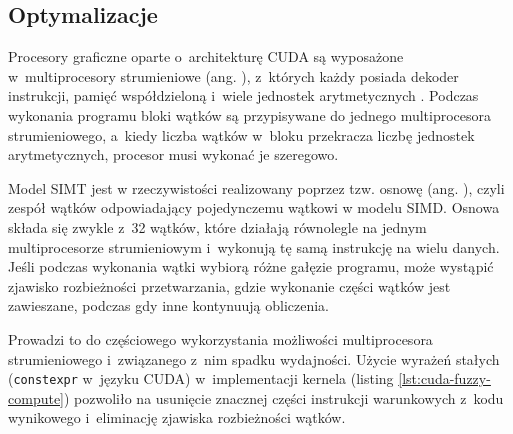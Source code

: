 \subsection*{Optymalizacje}

Procesory graficzne oparte o~architekturę CUDA są wyposażone w~multiprocesory strumieniowe
(ang. ), z~których każdy posiada dekoder instrukcji, pamięć
współdzieloną i~wiele jednostek arytmetycznych \cite{computer-arch}. Podczas wykonania programu
bloki wątków są przypisywane do jednego multiprocesora strumieniowego, a~kiedy liczba wątków w~bloku
przekracza liczbę jednostek arytmetycznych, procesor musi wykonać je szeregowo.

Model SIMT jest w rzeczywistości realizowany poprzez tzw. osnowę (ang. ), czyli zespół wątków odpowiadający
pojedynczemu wątkowi w modelu SIMD. Osnowa składa się zwykle z~32 wątków, które działają równolegle
na jednym multiprocesorze strumieniowym i~wykonują tę samą instrukcję na wielu danych.
Jeśli podczas wykonania wątki wybiorą różne gałęzie programu, może wystąpić zjawisko rozbieżności
przetwarzania, gdzie wykonanie części wątków jest zawieszane, podczas gdy inne kontynuują obliczenia.

Prowadzi to do częściowego wykorzystania możliwości multiprocesora strumieniowego i~związanego
z~nim spadku wydajności. Użycie wyrażeń stałych (\lstinline{constexpr} w~języku CUDA) w~implementacji
kernela (listing \ref{lst:cuda-fuzzy-compute}) pozwoliło na usunięcie znacznej części instrukcji
warunkowych z~kodu wynikowego i~eliminację zjawiska rozbieżności wątków.

